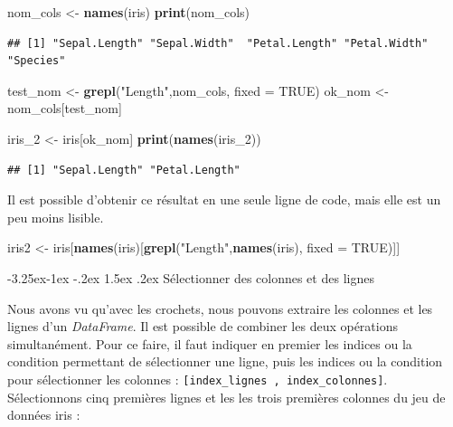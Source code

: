 \documentclass[
  11pt,
  french,
]{book}
\makeatletter
\newenvironment{Shaded}{\begin{snugshade}}{\end{snugshade}}
\newcommand{\DataTypeTok}[1]{\textcolor[rgb]{0.13,0.29,0.53}{#1}}
\newcommand{\DecValTok}[1]{\textcolor[rgb]{0.00,0.00,0.81}{#1}}
\newcommand{\KeywordTok}[1]{\textcolor[rgb]{0.13,0.29,0.53}{\textbf{#1}}}
\newcommand{\NormalTok}[1]{#1}
\newcommand{\OtherTok}[1]{\textcolor[rgb]{0.56,0.35,0.01}{#1}}
\newcommand{\StringTok}[1]{\textcolor[rgb]{0.31,0.60,0.02}{#1}}
\newenvironment{kframe}{%
\medskip{}
\setlength{\fboxsep}{.8em}
 \def\at@end@of@kframe{}%
 \ifinner\ifhmode%
  \def\at@end@of@kframe{\end{minipage}}%
  \begin{minipage}{\columnwidth}%
 \fi\fi%
 \def\FrameCommand##1{\hskip\@totalleftmargin \hskip-\fboxsep
 \colorbox{shadecolor}{##1}\hskip-\fboxsep
     \hskip-\linewidth \hskip-\@totalleftmargin \hskip\columnwidth}%
 \MakeFramed {\advance\hsize-\width
   \@totalleftmargin\z@ \linewidth\hsize
   \@setminipage}}%
 {\par\unskip\endMakeFramed%
 \at@end@of@kframe}
\renewenvironment{Shaded}{\begin{kframe}}{\end{kframe}}
\renewcommand\paragraph{\@startsection{paragraph}{4}{\z@}%
   {-3.25ex\@plus -1ex \@minus -.2ex}%
   {1.5ex \@plus .2ex}%
   {\normalfont\normalsize\bfseries}}
\makeatother
\begin{document}
\begin{Shaded}
\begin{Highlighting}[]
\NormalTok{nom_cols <-}\StringTok{ }\KeywordTok{names}\NormalTok{(iris)}
\KeywordTok{print}\NormalTok{(nom_cols)}
\end{Highlighting}
\end{Shaded}

\begin{verbatim}
## [1] "Sepal.Length" "Sepal.Width"  "Petal.Length" "Petal.Width"  "Species"
\end{verbatim}

\begin{Shaded}
\begin{Highlighting}[]
\NormalTok{test_nom <-}\StringTok{ }\KeywordTok{grepl}\NormalTok{(}\StringTok{"Length"}\NormalTok{,nom_cols, }\DataTypeTok{fixed =} \OtherTok{TRUE}\NormalTok{)}
\NormalTok{ok_nom <-}\StringTok{ }\NormalTok{nom_cols[test_nom]}

\NormalTok{iris_}\DecValTok{2}\NormalTok{ <-}\StringTok{ }\NormalTok{iris[ok_nom]}
\KeywordTok{print}\NormalTok{(}\KeywordTok{names}\NormalTok{(iris_}\DecValTok{2}\NormalTok{))}
\end{Highlighting}
\end{Shaded}

\begin{verbatim}
## [1] "Sepal.Length" "Petal.Length"
\end{verbatim}

Il est possible d'obtenir ce résultat en une seule ligne de code, mais elle est un peu moins lisible.

\begin{Shaded}
\begin{Highlighting}[]
\NormalTok{iris2 <-}\StringTok{ }\NormalTok{iris[}\KeywordTok{names}\NormalTok{(iris)[}\KeywordTok{grepl}\NormalTok{(}\StringTok{"Length"}\NormalTok{,}\KeywordTok{names}\NormalTok{(iris), }\DataTypeTok{fixed =} \OtherTok{TRUE}\NormalTok{)]]}
\end{Highlighting}
\end{Shaded}

\hypertarget{sect014283}{%
\paragraph{Sélectionner des colonnes et des lignes}\label{sect014283}}

Nous avons vu qu'avec les crochets, nous pouvons extraire les colonnes et les lignes d'un \emph{DataFrame}. Il est possible de combiner les deux opérations simultanément. Pour ce faire, il faut indiquer en premier les indices ou la condition permettant de sélectionner une ligne, puis les indices ou la condition pour sélectionner les colonnes : \texttt{{[}index\_lignes\ ,\ index\_colonnes{]}}. Sélectionnons cinq premières lignes et les les trois premières colonnes du jeu de données iris :
\end{document}
